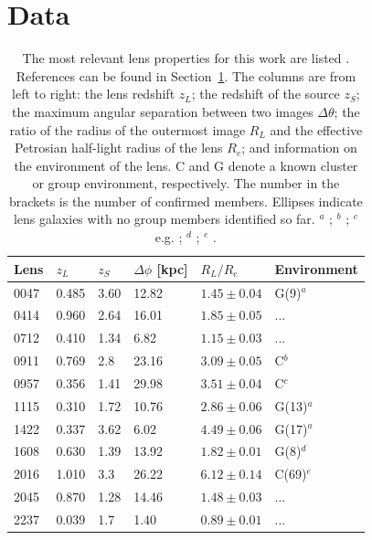 \documentclass[useAMS,usenatbib]{mn2e}
\begin{document}
\section{Data}\label{sec:data}
\setlength\tabcolsep{5pt}
\begin{table}
  \begin{center}
    \begin{tabular}{l l l l l l}
      Lens & $z_{L}$ & $z_{S}$ & $\Delta\phi$ [kpc] & $R_{L}/R_{e}$ & Environment \\ \hline
      0047 & 0.485 & 3.60 & 12.82 & $1.45\pm0.04$ & G(9)$^{a}$ \\
      0414 & 0.960 & 2.64 & 16.01 & $1.85\pm0.05$ & ... \\
      0712 & 0.410 & 1.34 & 6.82  & $1.15\pm0.03$ & ... \\
      0911 & 0.769 & 2.8  & 23.16 & $3.09\pm0.05$ & C$^{b}$ \\
      0957 & 0.356 & 1.41 & 29.98 & $3.51\pm0.04$ & C$^{c}$ \\
      1115 & 0.310 & 1.72 & 10.76 & $2.86\pm0.06$ & G(13)$^{a}$ \\
      1422 & 0.337 & 3.62 & 6.02  & $4.49\pm0.06$ & G(17)$^{a}$ \\
      1608 & 0.630 & 1.39 & 13.92 & $1.82\pm0.01$ & G(8)$^{d}$ \\
      2016 & 1.010 & 3.3  & 26.22 & $6.12\pm0.14$ & C(69)$^{e}$ \\
      2045 & 0.870 & 1.28 & 14.46 & $1.48\pm0.03$ & ... \\
      2237 & 0.039 & 1.7  & 1.40  & $0.89\pm0.01$ & ... \\
    \end{tabular}
    \caption[width=\linewidth]{The most relevant lens properties for this work are listed \citep[for an expanded version of this table see][]{2011ApJ...740...97L}. References can be found in Section~\ref{sec:data}. The columns are from left to right: the lens redshift $z_L$; the redshift of the source $z_S$; the maximum angular separation between two images $\Delta\theta$; the ratio of the radius of the outermost image $R_L$ and the effective Petrosian half-light radius of the lens $R_e$; and information on the environment of the lens. C and G denote a known cluster or group environment, respectively. The number in the brackets is the number of confirmed members. Ellipses indicate lens galaxies with no group members identified so far. \newline $^{a}$ \citet{2011ApJ...726...84W}; $^{b}$ \citet{2001ApJ...555....1M}; $^{c}$ e.g. \citet{1992MNRAS.254P..27G}; $^{d}$ \citet{2006ApJ...642...30F}; $^{e}$ \citet{2003MNRAS.344..337T}.}
    \label{tab:lensproperties}
  \end{center}
\end{table}
\setlength\tabcolsep{6pt}
\end{document}
